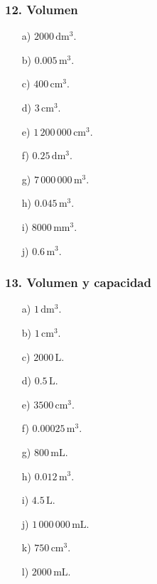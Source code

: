 \subsubsection*{12. Volumen}
\begin{enumerate}
    \item[a)] $2000\,\mathrm{dm^3}$.
    \item[b)] $0.005\,\mathrm{m^3}$.
    \item[c)] $400\,\mathrm{cm^3}$.
    \item[d)] $3\,\mathrm{cm^3}$.
    \item[e)] $1\,200\,000\,\mathrm{cm^3}$.
    \item[f)] $0.25\,\mathrm{dm^3}$.
    \item[g)] $7\,000\,000\,\mathrm{m^3}$.
    \item[h)] $0.045\,\mathrm{m^3}$.
    \item[i)] $8000\,\mathrm{mm^3}$.
    \item[j)] $0.6\,\mathrm{m^3}$.
\end{enumerate}

\subsubsection*{13. Volumen y capacidad}
\begin{enumerate}
    \item[a)] $1\,\mathrm{dm^3}$.
    \item[b)] $1\,\mathrm{cm^3}$.
    \item[c)] $2000\,\mathrm{L}$.
    \item[d)] $0.5\,\mathrm{L}$.
    \item[e)] $3500\,\mathrm{cm^3}$.
    \item[f)] $0.00025\,\mathrm{m^3}$.
    \item[g)] $800\,\mathrm{mL}$.
    \item[h)] $0.012\,\mathrm{m^3}$.
    \item[i)] $4.5\,\mathrm{L}$.
    \item[j)] $1\,000\,000\,\mathrm{mL}$.
    \item[k)] $750\,\mathrm{cm^3}$.
    \item[l)] $2000\,\mathrm{mL}$.
\end{enumerate}


